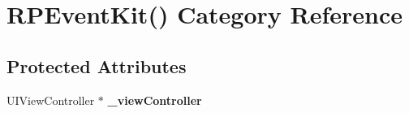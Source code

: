 \hypertarget{category_r_p_event_kit_07_08}{\section{R\-P\-Event\-Kit() Category Reference}
\label{category_r_p_event_kit_07_08}
}
\subsection*{Protected Attributes}
\begin{DoxyCompactItemize}
\item 
\hypertarget{category_r_p_event_kit_07_08_a6a1d1a3b94dd5998c0624d028d492fae}{U\-I\-View\-Controller $\ast$ {\bfseries \-\_\-view\-Controller}}\label{category_r_p_event_kit_07_08_a6a1d1a3b94dd5998c0624d028d492fae}

\end{DoxyCompactItemize}
